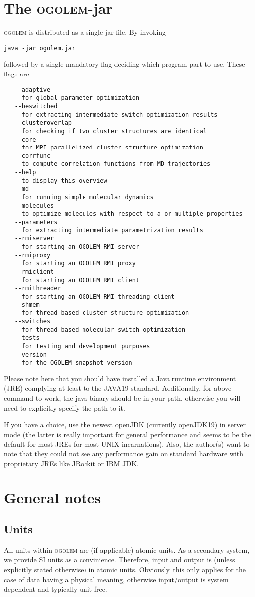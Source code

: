 \documentclass[a4paper,10pt]{scrbook}
\newcommand{\ogo}{\textsc{ogolem}}
\begin{document}
\section{The \ogo{}-jar}
\ogo{} is distributed as a single jar file. By invoking
\begin{verbatim}
java -jar ogolem.jar
\end{verbatim}
followed by a single mandatory flag deciding which program part to use. These
flags are
\begin{verbatim}
   --adaptive
     for global parameter optimization
   --beswitched
     for extracting intermediate switch optimization results
   --clusteroverlap
     for checking if two cluster structures are identical
   --core
     for MPI parallelized cluster structure optimization
   --corrfunc
     to compute correlation functions from MD trajectories
   --help
     to display this overview
   --md
     for running simple molecular dynamics
   --molecules
     to optimize molecules with respect to a or multiple properties
   --parameters
     for extracting intermediate parametrization results
   --rmiserver
     for starting an OGOLEM RMI server
   --rmiproxy
     for starting an OGOLEM RMI proxy
   --rmiclient
     for starting an OGOLEM RMI client
   --rmithreader
     for starting an OGOLEM RMI threading client
   --shmem
     for thread-based cluster structure optimization
   --switches
     for thread-based molecular switch optimization
   --tests
     for testing and development purposes
   --version
     for the OGOLEM snapshot version
\end{verbatim}
Please note here that you should have installed a Java runtime environment (JRE)
complying at least to the JAVA19 standard. Additionally, for above command to
work, the java binary should be in your path, otherwise you will need to
explicitly specify the path to it.

If you have a choice, use the newest openJDK (currently openJDK19) in server mode
(the latter is really important for general performance and seems to be the
default for most JREs for most UNIX incarnations). Also, the author(s) want to
note that they could not see any performance gain on standard hardware
with proprietary JREs like JRockit or IBM JDK.

\section{General notes}
\subsection{Units}
All units within \ogo{} are (if applicable) atomic units. As a secondary system,
we provide SI units as a convinience. Therefore, input and output is (unless 
explicitly
stated otherwise) in atomic units. Obviously, this only applies for the case of 
data
having a physical meaning, otherwise input/output is system dependent and 
typically
unit-free.
\end{document}
